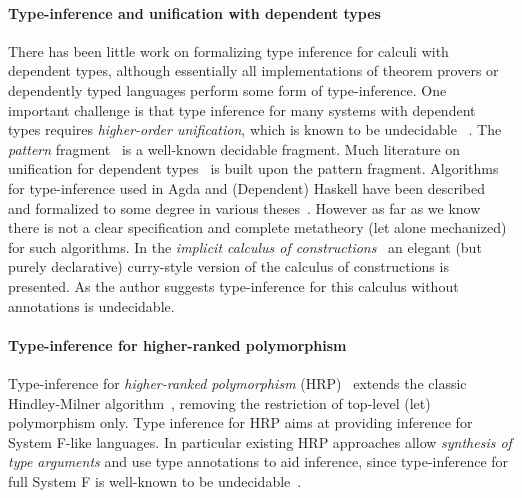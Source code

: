 \paragraph{Type-inference and unification with dependent types}
There has been little work on formalizing type inference for calculi
with dependent types, although essentially all implementations of
theorem provers or dependently typed languages perform some form of
type-inference.
One important challenge is that type inference for
many systems with dependent types requires \emph{higher-order unification},
which is known to be undecidable
~\cite{goldfarb1981undecidability}. The \textit{pattern}
fragment~\cite{miller1991unification} is a well-known decidable
fragment. Much literature on unification for dependent
types~\cite{reed2009higher,abel2011higher, gundry2013tutorial, Cockx:2016:UEP:2951913.2951917, ziliani2015unification, coen2004mathematical} is
built upon the pattern fragment. Algorithms for type-inference used in Agda and
(Dependent) Haskell have been described and formalized to some degree
in various theses~\cite{norell,gundry,dh}. However as far as we know
there is not a clear specification and complete metatheory (let alone
mechanized) for such algorithms. In the \emph{implicit calculus of
 constructions}~\cite{Miquel01} an elegant (but purely declarative) curry-style
version of the calculus of constructions is presented. As the author
suggests type-inference for this calculus without annotations is undecidable.

\paragraph{Type-inference for higher-ranked polymorphism}
Type-inference for \emph{higher-ranked polymorphism}
(HRP)~\cite{dunfield2013complete,le2003ml,leijen2008hmf,vytiniotis2008fph,jones2007practical,Serrano2018, odersky1996putting}
extends the classic Hindley-Milner algorithm~\cite{hindley1969principal,milner1978theory,damas1982principal},
removing the restriction of top-level (let) polymorphism only. Type
inference for HRP aims at providing inference for System F-like
languages. In particular existing HRP approaches allow \emph{synthesis of type arguments}
and use type annotations to aid
inference, since type-inference for full System F is
well-known to be undecidable~\cite{wells1999typability}.

